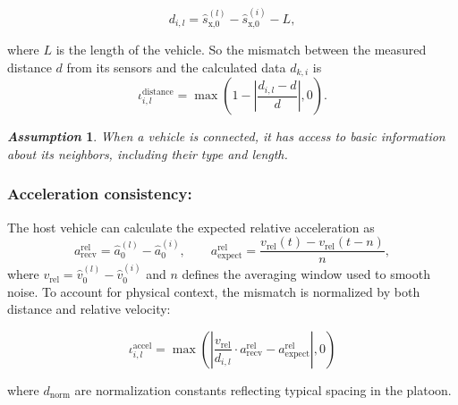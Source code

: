 \documentclass{ifacconf}
\newtheorem{remark}{\it \textbf{Remark}}%
\newtheorem{assumption}{\it \textbf{Assumption}}%
\begin{document}
\begin{equation*}
    d_{i,l} = \hat{s}_{\text{x,}0}^{(l)} - \hat{s}_{\text{x,}0}^{(i)} - L,
\end{equation*} 

where $L$ is the length of the vehicle. 
So the mismatch between the measured distance $d$ from its sensors and the calculated data $d_{k,i}$ is 
\begin{equation}
    \iota_{i,l}^{\text{distance}} = \max\left(1 - \left|\frac{d_{i,l} - d}{d}\right|, 0\right).
\end{equation}
\begin{assumption}\label{assum_connect}
When a vehicle is connected, it has access to basic information about its neighbors, including their type and length.
\end{assumption}

\subsubsection{Acceleration consistency:}


The host vehicle can calculate the expected relative acceleration as 
\[
a_{\text{recv}}^{\text{rel}} = \hat{a}_0^{(l)} - \hat{a}_0^{(i)}, \qquad
a_{\text{expect}}^{\text{rel}} = \frac{v_{\text{rel}}(t) - v_{\text{rel}}(t-n)}{n},
\]
where \(v_{\text{rel}} = \hat{v}_0^{(l)} - \hat{v}_0^{(i)}\) and \(n\) defines the averaging window used to smooth noise.
To account for physical context, the mismatch is normalized by both distance and relative velocity:

\begin{equation}
    \iota_{i,l}^{\text{accel}} =
    \max\left(
    \left|\frac{v_\text{rel}}{d_{i,l}} \cdot a_{\text{recv}}^{\text{rel}} - a_{\text{expect}}^{\text{rel}}\right|
    ,
    0
    \right)
\end{equation}

where \(d_{\text{norm}}\) are normalization constants reflecting typical spacing in the platoon.
\end{document}
